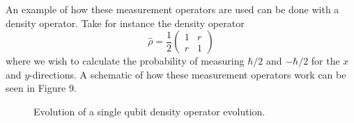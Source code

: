 \documentclass[twocolumn]{article}
\begin{document}
An example of how these measurement operators are used can be done with a density operator. Take for instance the density operator
\begin{equation} \label{Eq: DOME}
\hat{\rho}=\frac{1}{2}
\begin{pmatrix}
1 & r \\
r & 1
\end{pmatrix}
\end{equation}
where we wish to calculate the probability of measuring $\hbar/2$ and $-\hbar/2$ for the $x$ and $y$-directions. A schematic of how these measurement operators work can be seen in Figure 9.
\begin{figure}[ht]
    \centering
    \caption{\footnotesize{Evolution of a single qubit density operator evolution.}}
    \label{Fig: SQDO}
\end{figure}
\end{document}
